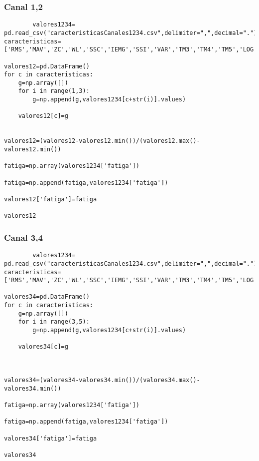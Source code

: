     \subsubsection{Canal 1,2}
        \begin{lstlisting}
        valores1234= pd.read_csv("caracteristicasCanales1234.csv",delimiter=",",decimal=".")
caracteristicas=['RMS','MAV','ZC','WL','SSC','IEMG','SSI','VAR','TM3','TM4','TM5','LOG','ACC','MNF','MDF']

valores12=pd.DataFrame()
for c in caracteristicas:
    g=np.array([])
    for i in range(1,3):
        g=np.append(g,valores1234[c+str(i)].values)
    
    valores12[c]=g
        

valores12=(valores12-valores12.min())/(valores12.max()-valores12.min())

fatiga=np.array(valores1234['fatiga'])

fatiga=np.append(fatiga,valores1234['fatiga'])

valores12['fatiga']=fatiga

valores12
        \end{lstlisting}
        
    \subsubsection{Canal 3,4}
        \begin{lstlisting}
        valores1234= pd.read_csv("caracteristicasCanales1234.csv",delimiter=",",decimal=".")
caracteristicas=['RMS','MAV','ZC','WL','SSC','IEMG','SSI','VAR','TM3','TM4','TM5','LOG','ACC','MNF','MDF']

valores34=pd.DataFrame()
for c in caracteristicas:
    g=np.array([])
    for i in range(3,5):
        g=np.append(g,valores1234[c+str(i)].values)
    
    valores34[c]=g
        


valores34=(valores34-valores34.min())/(valores34.max()-valores34.min())

fatiga=np.array(valores1234['fatiga'])

fatiga=np.append(fatiga,valores1234['fatiga'])

valores34['fatiga']=fatiga

valores34
        \end{lstlisting}
    

